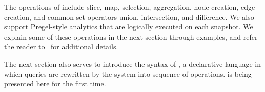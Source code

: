 The operations of \tga include slice, map, selection, aggregation,
node creation, edge creation, and common set operators union,
intersection, and difference.  We also support Pregel-style analytics
that are logically executed on each snapshot.  We explain some of
these operations in the next section through examples, and refer the
reader to~\cite{PortalarXiv2016} for additional details.

The next section also serves to introduce the syntax of \ql, a
declarative language in which queries are rewritten by the \sys system
into sequence of \tga operations.  \ql is being presented here for the
first time.
